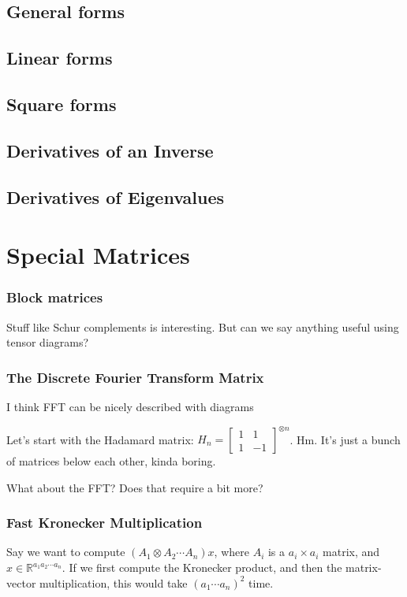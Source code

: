 \documentclass[oneside]{book}
\newcommand{\smat}[1]{\left[\begin{smallmatrix}#1\end{smallmatrix}\right]}
\newcommand{\R}{\mathbb R}
\begin{document}
\section{General forms}
\section{Linear forms}
\section{Square forms}


\section{Derivatives of an Inverse}
\section{Derivatives of Eigenvalues}


\chapter{Special Matrices}
\subsection{Block matrices}
Stuff like Schur complements is interesting.
But can we say anything useful using tensor diagrams?

\subsection{The Discrete Fourier Transform Matrix}
I think FFT can be nicely described with diagrams

Let's start with the Hadamard matrix:
$H_n = \smat{1 & 1 \\ 1 & -1}^{\otimes n}$.
Hm. It's just a bunch of matrices below each other, kinda boring.

What about the FFT?
Does that require a bit more?





\subsection{Fast Kronecker Multiplication}

Say we want to compute $(A_1\otimes A_2\cdots A_n)x$,
where $A_i$ is a $a_i \times a_i$ matrix, and $x \in \R^{a_1 a_2 \cdots a_n}$.
If we first compute the Kronecker product, and then the matrix-vector multiplication, this would take $(a_1\cdots a_n)^2$ time.
\end{document}

